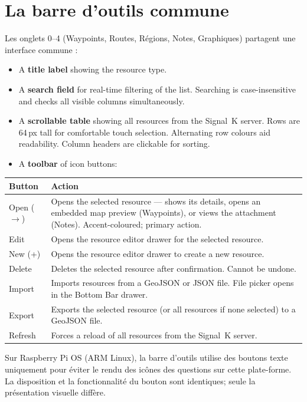 \section{La barre d'outils commune}

Les onglets 0--4 (Waypoints, Routes, Régions, Notes, Graphiques) partagent une interface commune :

\begin{itemize}
  \item A \textbf{title label} showing the resource type.
  \item A \textbf{search field} for real-time filtering of the list. Searching is case-insensitive and checks all visible columns simultaneously.
  \item A \textbf{scrollable table} showing all resources from the Signal~K server. Rows are 64\,px tall for comfortable touch selection. Alternating row colours aid readability. Column headers are clickable for sorting.
  \item A \textbf{toolbar} of icon buttons:
\end{itemize}

\begin{longtable}{L{3cm} L{10.7cm}}
\toprule
{}
{\sffamily\bfseries\color{white} Button} &
{\sffamily\bfseries\color{white} Action} \\
\midrule
Open ($\rightarrow$) & Opens the selected resource --- shows its details, opens an embedded map preview (Waypoints), or views the attachment (Notes). Accent-coloured; primary action. \\
Edit & Opens the resource editor drawer for the selected resource. \\
New (+) & Opens the resource editor drawer to create a new resource. \\
Delete & Deletes the selected resource after confirmation. Cannot be undone. \\
Import & Imports resources from a GeoJSON or JSON file. File picker opens in the Bottom Bar drawer. \\
Export & Exports the selected resource (or all resources if none selected) to a GeoJSON file. \\
Refresh & Forces a reload of all resources from the Signal~K server. \\
\bottomrule
\end{longtable}

\begin{notebox}
Sur Raspberry Pi OS (ARM Linux), la barre d'outils utilise des boutons texte uniquement pour éviter le rendu des icônes
des questions sur cette plate-forme.
La disposition et la fonctionnalité du bouton sont identiques; seule la présentation visuelle diffère.
\end{notebox}


